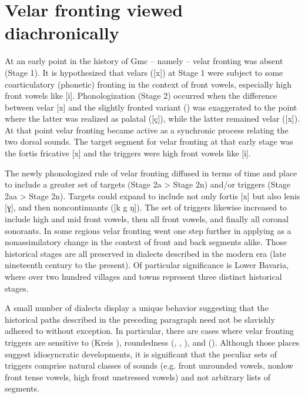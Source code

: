 \section{{Velar} {fronting} {viewed} {diachronically}}\label{sec:18.3}

At an early point in the history of Gmc -- namely  -- velar fronting was absent (Stage 1). It is hypothesized that velars ([x]) at Stage 1 were subject to some coarticulatory (phonetic) fronting in the context of front vowels, especially high front vowels like [i]. Phonologization (Stage 2) occurred when the difference between velar [x] and the slightly fronted variant () was exaggerated to the point where the latter was realized as palatal ([ç]), while the latter remained velar ([x]). At that point velar fronting became active as a synchronic process relating the two dorsal sounds. The target segment for velar fronting at that early stage was the fortis fricative [x] and the triggers were high front vowels like [i].

The newly phonologized rule of velar fronting diffused in terms of time and place to include a greater set of targets (Stage 2a > Stage 2n) and/or triggers (Stage 2aa > Stage 2n). Targets could expand to include not only fortis [x] but also lenis [ɣ], and then noncontinuants ([k g ŋ]). The set of triggers likewise increased to include high and mid front vowels, then all front vowels, and finally all coronal sonorants. In some regions velar fronting went one step further in applying as a nonassimilatory change in the context of front and back segments alike. Those historical stages are all preserved in dialects described in the modern era (late nineteenth century to the present). Of particular significance is Lower Bavaria, where over two hundred villages and towns represent three distinct historical stages.

A small number of dialects display a unique behavior suggesting that the historical paths described in the preceding paragraph need not be slavishly adhered to without exception. In particular, there are cases where velar fronting triggers are sensitive to  (Kreis ), roundedness (, , ), and  (). Although those places suggest idiosyncratic developments, it is significant that the peculiar sets of triggers comprise natural classes of sounds (e.g. front unrounded vowels, nonlow front tense vowels, high front unstressed vowels) and not arbitrary lists of segments.

